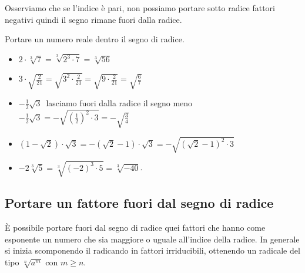 Osserviamo che se l'indice è pari, non possiamo portare sotto radice 
fattori negativi quindi il segno rimane fuori dalla radice.

% 
\begin{esempio}{}{}
Portare un numero reale dentro il segno di radice.
\begin{itemize}
\item \(2\cdot \sqrt[3]7=\sqrt[3]{2^3\cdot 7}=\sqrt[3]{56}\)
\item \(3\cdot \sqrt{\frac 2{21}}= \sqrt{3^2 \cdot \frac 2{21}}=
      \sqrt{9 \cdot \frac 2{21}}= \sqrt{\frac 6 7}\)
\item \(-\frac 1 2\sqrt{3}\)\, lasciamo fuori dalla radice il segno meno 
      \(-\frac 1 2\sqrt{3}=-\sqrt{\left(\frac 1 2\right)^2\cdot 3}=
      -\sqrt{\frac 3 4}\)
\item \((1-\sqrt{2})\cdot \sqrt{3}=-(\sqrt{2}-1)\cdot \sqrt{3}=
      -\sqrt{(\sqrt{2}-1)^2\cdot 3}\)
\item \(-2\sqrt[3]5=\sqrt[3]{(-2)^3\cdot 5}=\sqrt[3]{-40}\).
\end{itemize}
\end{esempio}

\subsection{Portare un fattore fuori dal segno di radice}

È possibile portare fuori dal segno di radice quei fattori che hanno come 
esponente un numero che sia maggiore o uguale all'indice della radice. 
In generale si inizia scomponendo il radicando in fattori irriducibili, 
ottenendo un radicale del tipo \(\sqrt[n]{a^m}\) con \(m \geqslant n\).

% 
% 

